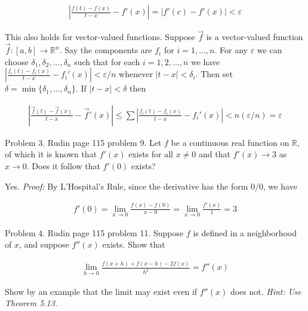 \documentclass{article}
\begin{document}
  \begin{align*}
    \left|\frac{f(t)-f(x)}{t-x}-f'(x)\right| = |f'(c)-f'(x)| < \varepsilon
  \end{align*}

  \vspace{1cm}

  This also holds for vector-valued functions.  Suppose $\vec f$ is a vector-valued function $\vec f: [a,b]\to \mathbb R^n$.  Say the components are $f_i$ for $i=1,\dots,n$.  For any $\varepsilon$ we can choose $\delta_1, \delta_2, ...,\delta_n$ such that for each $i=1,2,...,n$ we have $\left|\frac{f_i(t)-f_i(x)}{t-x} - f_i'(x)\right|<\varepsilon/n$ whenever $|t-x|<\delta_i$.   Then set $\delta = \min\{\delta_1, \dots, \delta_n\}$.  If $|t-x|<\delta$ then

  \begin{align*}
    \left|\frac{\vec f(t)-\vec f (x)}{t-x}-\vec f'(x)\right| \leq \sum\left|\frac{f_i(t)-f_i(x)}{t-x} - f_i'(x)\right| < n(\varepsilon/n) = \varepsilon
  \end{align*}

  \pagebreak

  {\Large \color{Sepia} Problem 3. Rudin page 115 problem 9. Let $f$ be a continuous real function on $\mathbb R$, of which it is known that $f'(x)$ exists for all $x\ne 0$ and that $f'(x)\to 3$ as $x\to 0$.  Does it follow that $f'(0)$ exists?}

  \vspace{1cm}

  Yes.  {\it Proof:}  By L'Hospital's Rule, since the derivative has the form 0/0, we have

  \begin{align*}
    f'(0) = \lim_{x\to 0}\frac{f(x)-f(0)}{x-0} = \lim_{x\to 0}\frac{f'(x)}{1}=3
  \end{align*}

  \pagebreak

  {\Large \color{Sepia} Problem 4. Rudin page 115 problem 11. Suppose $f$ is defined in a neighborhood of $x$, and suppose $f''(x)$ exists.  Show that

  \begin{align*}
    \lim_{h\to 0} \frac{f(x+h)+f(x-h)-2f(x)}{h^2} = f''(x)
  \end{align*}

  Show by an example that the limit may exist even if $f''(x)$ does not. {\it Hint: Use Theorem 5.13.}}

  \vspace{1cm}
\end{document}

